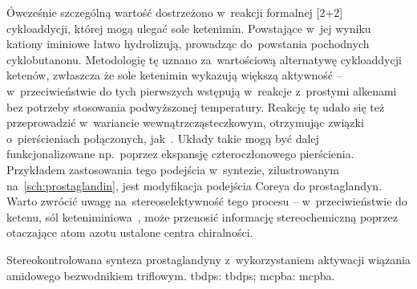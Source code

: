Ówcześnie szczególną wartość dostrzeżono w~reakcji formalnej [2+2] cykloaddycji, której mogą ulegać sole ketenimin.
Powstające w~jej wyniku kationy iminiowe łatwo hydrolizują, prowadząc do~powstania pochodnych cyklobutanonu.
Metodologię tę uznano za~wartościową alternatywę cykloaddycji ketenów, zwłaszcza że sole ketenimin wykazują większą aktywność \---
  w~przeciwieństwie do tych pierwszych wstępują w~reakcje z~prostymi alkenami bez potrzeby stosowania podwyższonej temperatury.
Reakcję tę udało się też przeprowadzić w~wariancie wewnątrzcząsteczkowym,
  otrzymując związki o~pierścieniach połączonych, jak~.
Układy takie mogą być dalej funkcjonalizowane np.~poprzez ekspansję czteroczłonowego pierścienia.
Przykładem zastosowania tego podejścia w~syntezie, zilustrowanym na~\cref{sch:prostaglandin}, jest modyfikacja podejścia Coreya do prostaglandyn.
Warto zwrócić uwagę na~stereoselektywność tego procesu \--- w~przeciwieństwie do ketenu,
  sól keteniminiowa~, może przenosić informację stereochemiczną poprzez otaczające atom azotu ustalone centra chiralności.
\begin{scheme*}
  \centering
  
  \caption{
    Stereokontrolowana synteza prostaglandyny z~wykorzystaniem aktywacji wiązania amidowego bezwodnikiem triflowym.
    \acrshort{tbdps}: \acrlong{tbdps}; \acrshort{mcpba}: \acrlong{mcpba}.
  }
  \label{sch:prostaglandin}
\end{scheme*}

